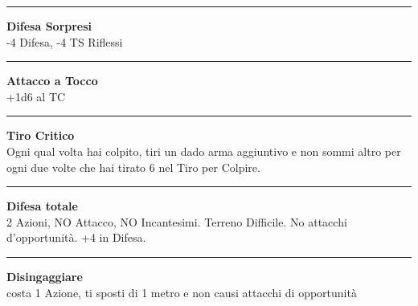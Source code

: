 \documentclass[a4paper,12 pt,openany]{book}
\newcommand{\riga}{\rule{\textwidth}{0.4pt}}
\begin{document}
\begin{textblock*}{6.2cm}
\riga

\textbf{Difesa Sorpresi}\\ -4 Difesa, -4 TS Riflessi

\riga

\textbf{Attacco a Tocco}\\ +1d6 al TC

\riga

\textbf{Tiro Critico}\\
Ogni qual volta hai colpito, tiri un dado arma aggiuntivo e non sommi altro per ogni due volte che hai tirato 6 nel Tiro per Colpire.

\riga


\textbf{Difesa totale}\\
2 Azioni, NO Attacco, NO Incantesimi. Terreno Difficile. No attacchi d'opportunità. +4 in Difesa.

\riga


\textbf{Disingaggiare}\\
costa 1 Azione, ti sposti di 1 metro e non causi attacchi di opportunità

\end{textblock*}



~\newpage
\end{document}
